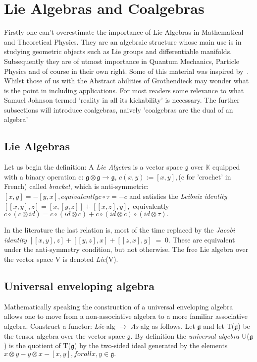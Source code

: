 \documentclass[preprint, 5p, 10pt]{elsarticle}
\theoremstyle{plain}
\begin{document}
\section{Lie Algebras and Coalgebras}
Firstly one can't overestimate the importance of Lie Algebras in Mathematical and Theoretical Physics. 
They are an algebraic structure whose main use is in studying geometric objects
 such as Lie groups and differentiable manifolds. Subsequently they are of utmost importance in 
Quantum Mechanics, Particle Physics and of course in their own right. Some of this material was
inspired by~\cite{FoundationsDiffMan,Ben-Aryeh2004}.
Whilst those of us with the Abstract abilities of Grothendieck may wonder what is the point in including
applications. For most readers some relevance to what Samuel Johnson termed 'reality 
in all its kickability' is necessary.
The further subsections will introduce coalgebras, naively 'coalgebras are the dual of an algebra'
\subsection{Lie Algebras}

Let us begin the definition:
 A \textit{Lie Algebra} is a vector space $\mathfrak{g}$ over $\mathbb{K}$ equipped with a binary
operation c: $\mathfrak{g}\otimes \mathfrak{g} \rightarrow \mathfrak{g}$, $c(x,y):=[x,y],$(c for 'crochet'
in French) called \textit{bracket}, which is anti-symmetric:
$
 [x,y] = -[y,x], equivalently c \circ \tau = -c
$
and satisfies the \textit{Leibniz identity}
$ [[x,y],z]=[x,[y,z]]+[[x,z],y],
$
equivalently $c \circ (c \otimes id) = c \circ (id \otimes c) +
c \circ (id \otimes c)\circ (id \otimes \tau).$

In the literature the last relation is, most of the time replaced by the \textit{Jacobi identity}
$
 [[x,y],z]+[[y,z],x]+[[z,x],y]\;=\;0.
$
These are equivalent under the anti-symmetry condition, but not otherwise.
The free Lie algebra over the vector space V is denoted \textit{Lie}(V).
\subsection{Universal enveloping algebra}
Mathematically speaking the construction of a universal enveloping algebra allows
one to move from a non-associative algebra to a more familiar associative algebra.
Construct a functor: \textit{Lie}-alg $\rightarrow$ \textit{As}-alg as follows. Let
$\mathfrak{g}$ and let T($\mathfrak{g}$) be the tensor algebra over the vector space $\mathfrak{g}$.
By definition the \textit{universal algebra} U($\mathfrak{g}$) is the quotient of T($\mathfrak{g}$) 
by the two-sided ideal generated by the elements 
$
 x \otimes y - y \otimes x -[x,y], for all x,y \in \mathfrak{g}.
$
\end{document}
